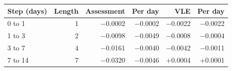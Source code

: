 \begin{tabular}{@{}lrrrrr@{}}\toprule
Step (days) & Length & Assessment & Per day & VLE & Per day \\ \midrule
0 to 1 & 1 & $-$0.0002 & $-$0.0002 & $-$0.0022 & $-$0.0022 \\
1 to 3 & 2 & $-$0.0098 & $-$0.0049 & $-$0.0008 & $-$0.0004 \\
3 to 7 & 4 & $-$0.0161 & $-$0.0040 & $-$0.0042 & $-$0.0011 \\
7 to 14 & 7 & $-$0.0320 & $-$0.0046 & +0.0004 & +0.0001 \\
\bottomrule\end{tabular}

